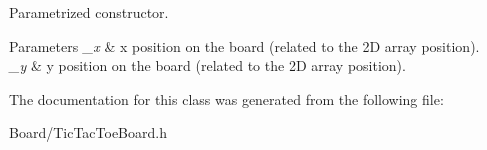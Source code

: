 Parametrized constructor. 


\begin{DoxyParams}{Parameters}
{\em \+\_\+x} & x position on the board (related to the 2D array position). \\
\hline
{\em \+\_\+y} & y position on the board (related to the 2D array position). \\
\hline
\end{DoxyParams}


The documentation for this class was generated from the following file\+:\begin{DoxyCompactItemize}
\item 
Board/Tic\+Tac\+Toe\+Board.\+h\end{DoxyCompactItemize}
